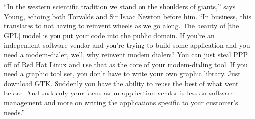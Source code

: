

\ifdefined\eng
``In the western scientific tradition we stand on the shoulders of giants,'' says Young, echoing both Torvalds and Sir Isaac Newton before him. ``In business, this translates to not having to reinvent wheels as we go along. The beauty of [the GPL] model is you put your code into the public domain. If you're an independent software vendor and you're trying to build some application and you need a modem-dialer, well, why reinvent modem dialers? You can just steal PPP off of Red Hat Linux and use that as the core of your modem-dialing tool. If you need a graphic tool set, you don't have to write your own graphic library. Just download GTK. Suddenly you have the ability to reuse the best of what went before. And suddenly your focus as an application vendor is less on software management and more on writing the applications specific to your customer's needs.''
\fi

